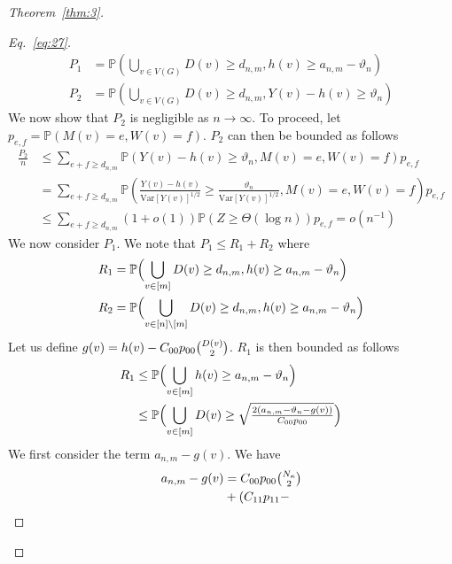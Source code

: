 \documentclass[draftcls]{IEEEtran}
\theoremstyle{definition}
\begin{document}
\begin{proof}[Theorem~\ref{thm:3}]
\begin{proof}[Eq.~\eqref{eq:27}]
\begin{align*}
    P_1 &= \mathbb{P}(\bigcup_{v \in V(G)} D(v) \geq d_{n,m}, h(v) \geq
    a_{n,m} - \vartheta_n) \\
    P_2 &= \mathbb{P}(\bigcup_{v \in V(G)} D(v) \geq d_{n,m},
    Y(v) - h(v) \geq \vartheta_n)
  \end{align*}
  We now show that $P_2$ is negligible as $n \rightarrow \infty$. To
  proceed, let $p_{e,f} = \mathbb{P}(M(v) = e, W(v) =
f)$. $P_2$ can then be bounded as follows
\begin{equation*}
  \begin{split}
    \frac{P_2}{n} & \leq \sum_{e + f \geq
        d_{n,m}}{\mathbb{P}( Y(v) - h(v) \geq
      \vartheta_{n}, M(v) = e, W(v) = f) p_{e,f}}
  \\
  &=  \sum_{e + f \geq d_{n,m}}{\mathbb{P}(
    \tfrac{Y(v) - h(v)}{\mathrm{Var}[Y(v)]^{1/2}} \geq
    \tfrac{\vartheta_n}{\mathrm{Var}[Y(v)]^{1/2}}, M(v) = e, W(v) = f) p_{e,f}} \\
    &\leq \sum_{e + f \geq d_{n,m}} (1 + o(1))
    \mathbb{P}(Z \geq \Theta(\log{n})) p_{e,f} = o(n^{-1})
  \end{split}
\end{equation*}
We now consider $P_1$. We note that $P_1 \leq R_1 + R_2$
where
\begin{align*}
  R_1 &= \mathbb{P}\Bigl(\bigcup_{v \in [m]} D(v) \geq
  d_{n,m}, h(v) \geq a_{n,m} - \vartheta_n \Bigr) \\  
  R_2 &= \mathbb{P}\Bigl(\bigcup_{v \in [n] \setminus [m]} D(v) \geq
  d_{n,m}, h(v) \geq a_{n,m} - \vartheta_n \Bigr)
\end{align*}
Let us define $g(v) = h(v) - C_{00}p_{00} \tbinom{D(v)}{2}$.
$R_1$ is then bounded as follows
\begin{equation}
  \begin{split}
    \label{eq:36}
    R_1 &\leq \mathbb{P}\Bigl( \bigcup_{v \in [m]} h(v) \geq
    a_{n,m} - \vartheta_{n} \Bigr) \\
    &\leq \mathbb{P}\Bigl(\bigcup_{v \in [m]} D(v) \geq
      \sqrt{\tfrac{2 (a_{n,m} - \vartheta_n -
        g(v))}{C_{00} p_{00}}} \Bigr)
  \end{split}
\end{equation}
We first consider the term $a_{n,m} - g(v)$. We have
\begin{equation*}
  \begin{split}
  a_{n,m} - g(v) &= C_{00} p_{00} \tbinom{N_\kappa}{2} \\ &+ (C_{11}p_{11} -

\end{split}
\end{equation*}
\end{proof}
\end{proof}
\end{document}
